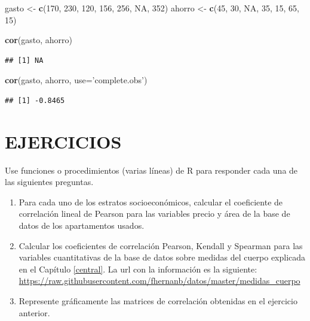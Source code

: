 \documentclass[10pt,]{krantz}
\makeatletter
\newenvironment{Shaded}{\begin{snugshade}}{\end{snugshade}}
\newcommand{\KeywordTok}[1]{\textcolor[rgb]{0.13,0.29,0.53}{\textbf{#1}}}
\newcommand{\DataTypeTok}[1]{\textcolor[rgb]{0.13,0.29,0.53}{#1}}
\newcommand{\DecValTok}[1]{\textcolor[rgb]{0.00,0.00,0.81}{#1}}
\newcommand{\StringTok}[1]{\textcolor[rgb]{0.31,0.60,0.02}{#1}}
\newcommand{\OtherTok}[1]{\textcolor[rgb]{0.56,0.35,0.01}{#1}}
\newcommand{\NormalTok}[1]{#1}
\newenvironment{kframe}{%
\medskip{}
\setlength{\fboxsep}{.8em}
 \def\at@end@of@kframe{}%
 \ifinner\ifhmode%
  \def\at@end@of@kframe{\end{minipage}}%
  \begin{minipage}{\columnwidth}%
 \fi\fi%
 \def\FrameCommand##1{\hskip\@totalleftmargin \hskip-\fboxsep
 \colorbox{shadecolor}{##1}\hskip-\fboxsep
     \hskip-\linewidth \hskip-\@totalleftmargin \hskip\columnwidth}%
 \MakeFramed {\advance\hsize-\width
   \@totalleftmargin\z@ \linewidth\hsize
   \@setminipage}}%
 {\par\unskip\endMakeFramed%
 \at@end@of@kframe}
\renewenvironment{Shaded}{\begin{kframe}}{\end{kframe}}
\makeatother
\begin{document}
\begin{Shaded}
\begin{Highlighting}[]
\NormalTok{gasto <-}\StringTok{ }\KeywordTok{c}\NormalTok{(}\DecValTok{170}\NormalTok{, }\DecValTok{230}\NormalTok{, }\DecValTok{120}\NormalTok{, }\DecValTok{156}\NormalTok{, }\DecValTok{256}\NormalTok{, }\OtherTok{NA}\NormalTok{, }\DecValTok{352}\NormalTok{)}
\NormalTok{ahorro <-}\StringTok{ }\KeywordTok{c}\NormalTok{(}\DecValTok{45}\NormalTok{, }\DecValTok{30}\NormalTok{, }\OtherTok{NA}\NormalTok{, }\DecValTok{35}\NormalTok{, }\DecValTok{15}\NormalTok{, }\DecValTok{65}\NormalTok{, }\DecValTok{15}\NormalTok{)}

\KeywordTok{cor}\NormalTok{(gasto, ahorro)}
\end{Highlighting}
\end{Shaded}

\begin{verbatim}
## [1] NA
\end{verbatim}

\begin{Shaded}
\begin{Highlighting}[]
\KeywordTok{cor}\NormalTok{(gasto, ahorro, }\DataTypeTok{use=}\StringTok{'complete.obs'}\NormalTok{)}
\end{Highlighting}
\end{Shaded}

\begin{verbatim}
## [1] -0.8465
\end{verbatim}

\section*{EJERCICIOS}\label{ejercicios-5}


Use funciones o procedimientos (varias líneas) de R para responder cada
una de las siguientes preguntas.

\begin{enumerate}
\def\labelenumi{\arabic{enumi}.}
\item
  Para cada uno de los estratos socioeconómicos, calcular el coeficiente
  de correlación lineal de Pearson para las variables precio y área de
  la base de datos de los apartamentos usados.
\item
  Calcular los coeficientes de correlación Pearson, Kendall y Spearman
  para las variables cuantitativas de la base de datos sobre medidas del
  cuerpo explicada en el Capítulo \ref{central}. La url con la
  información es la siguiente:
  \url{https://raw.githubusercontent.com/fhernanb/datos/master/medidas_cuerpo}
\item
  Represente gráficamente las matrices de correlación obtenidas en el
  ejercicio anterior.
\end{enumerate}
\end{document}
